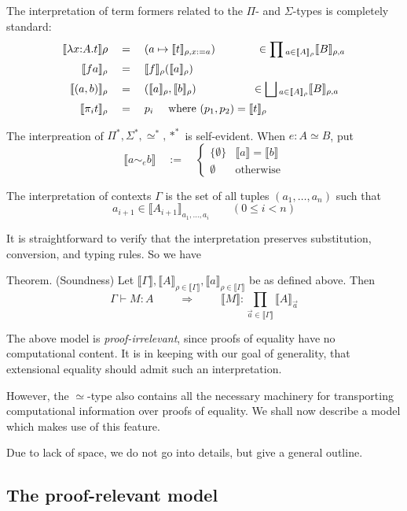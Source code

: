 \documentclass[10pt]{article}
\newcommand{\then}{\;\Longrightarrow\;}
\newcommand{\sta}{*}
\newcommand{\setof}[1]{\{{#1}\}}
\newcommand{\semof}[1]{\llbracket{#1}\rrbracket}
\newcommand{\eq}{\quad=\quad}
\newcommand{\eeq}{\simeq}
\newcommand{\seq}{{\eeq}^*}
\newcommand{\df}{\quad:=\quad}
\newenvironment{theorem}{{\sc Theorem.}}{}
\begin{document}
The interpretation of term formers related to the $\Pi$- and
$\Sigma$-types is completely standard:
\begin{align*}
    \semof{\lambda x{:}A.t}\rho &\eq (a \mapsto
    \semof{t}_{\rho,x:=a})  \qquad\qquad {\in \prod{}_{a{\in}\semof{A}_\rho}\semof{B}_{\rho,a}}\\
    \semof{f a}_\rho &\eq \semof{f}_\rho(\semof{a}_\rho)\\
    \semof{(a,b)}_\rho &\eq (\semof{a}_\rho,\semof{b}_\rho)
    \hspace{1.87cm}{\in \bigsqcup{}_{a{\in}\semof{A}_\rho} \semof{B}_{\rho,a}}\\
    \semof{\pi_i t}_\rho &\eq p_i \quad \text{ where }(p_1,p_2)=\semof{t}_\rho
\end{align*}

The interpreation of $\Pi^*, \Sigma^*, \seq, \sta^\sta$ is
self-evident.  When $e : A \eeq B$, put
\[  \semof{ a \sim_e b} \df \begin{cases}
\setof{\emptyset} & \semof{a} = \semof{b}\\
\emptyset &\text{otherwise}
\end{cases}\]

The interpretation of contexts $\Gamma$ is the set of all tuples
$(a_1,\dots,a_n)$ such that
\[ a_{i+1} \in \semof{A_{i+1}}_{a_1,\dots,a_i}
\qquad (0 \le i < n) \]

It is straightforward to verify that the interpretation preserves
substitution, conversion, and typing rules.  So we have

\begin{theorem} (Soundness)
Let $\semof{\Gamma}, \semof{A}_{\rho \in \semof{\Gamma}},
\semof{a}_{\rho \in \semof{\Gamma}}$ be as defined above.  Then
\[ \Gamma \vdash M : A \qquad \then \qquad
\semof{M} : \prod_{\vec a \in \semof{\Gamma}} \semof{A}_{\vec a} \]
\end{theorem}

The above model is \emph{proof-irrelevant}, since proofs of equality
have no computational content.  It is in keeping with our goal of
generality, that extensional equality should admit such an
interpretation.

However, the $\eeq$-type also contains all the necessary machinery
for transporting computational information over proofs of equality.
We shall now describe a model which makes use of this feature.

Due to lack of space, we do not go into details, but give a general outline.
\subsection{The proof-relevant model}
\end{document}
